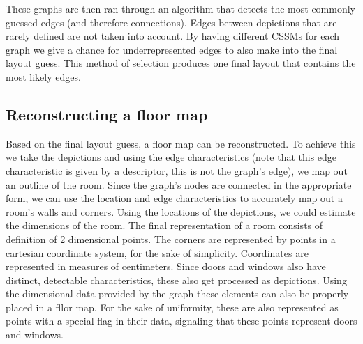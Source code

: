 These graphs are then ran through an algorithm that detects the most commonly guessed edges (and therefore connections). Edges between depictions that are rarely defined are not taken into account. By having different CSSMs for each graph we give a chance for underrepresented edges to also make into the final layout guess. This method of selection produces one final layout that contains the most likely edges.


\subsection{Reconstructing a floor map}

Based on the final layout guess, a floor map can be reconstructed. To achieve this we take the depictions and using the edge characteristics (note that this edge characteristic is given by a descriptor, this is not the graph's edge), we map out an outline of the room. Since the graph's nodes are connected in the appropriate form, we can use the location and edge characteristics to accurately map out a room's walls and corners. Using the locations of the depictions, we could estimate the dimensions of the room. The final representation of a room consists of definition of 2 dimensional points. The corners are represented by points in a cartesian coordinate system, for the sake of simplicity. Coordinates are represented in measures of centimeters. Since doors and windows also have distinct, detectable characteristics, these also get processed as depictions. Using the dimensional data provided by the graph these elements can also be properly placed in a fllor map. For the sake of uniformity, these are also represented as points with a special flag in their data, signaling that these points represent doors and windows.



